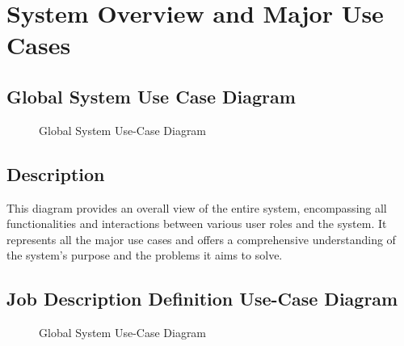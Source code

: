 \section{System Overview and Major Use Cases}

\subsection{Global System Use Case Diagram}
\begin{figure}[H]
    \centering
    \caption{ Global System Use-Case Diagram }
    \label{fig:Global_System_UseCase_Diagram}
\end{figure}

\subsection*{Description}
This diagram provides an overall view of the entire system, encompassing all functionalities and interactions between various user roles and the system. It represents all the major use cases and offers a comprehensive understanding of the system's purpose and the problems it aims to solve.

\subsection{Job Description Definition Use-Case Diagram}
\begin{figure}[H]
    \centering
    \caption{ Global System Use-Case Diagram }
    \label{fig:Job_Description_Definition_UseCase_Diagram}
\end{figure}

